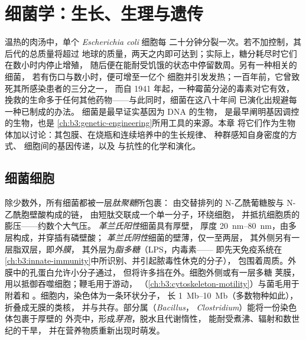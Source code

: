 \chapter{细菌学：生长、生理与遗传}\label{ch:b3:bacteriology}

温热的肉汤中，单个 \emph{Escherichia coli} 细胞每
二十分钟分裂一次。若不加控制，其后代的总质量将超过
地球的质量，两天之内即可达到；实际上，糖分耗尽时它们在数小时内停止增殖，
随后便在能耐受饥饿的状态中停留数周。另有一种相关的细菌，
若有伤口与数小时，便可增至一亿个
细胞并引发发热；一百年前，它曾致死其所感染患者的三分之一，
而自 1941 年起，一种霉菌分泌的毒素对它有效，
挽救的生命多于任何其他药物——与此同时，细菌在这八十年间
已演化出规避每一种已制成的办法。
细菌是最早证实基因为 DNA 的生物，
是最早阐明基因调控的生物，也是
\cref{ch:b3:genetic-engineering}所用工具的来源。本章
将它们作为生物体加以讨论：其包膜、在烧瓶和连续培养中的生长规律、
种群感知自身密度的方式、
细胞间的基因传递，以及
与抗性的化学和演化。

\section{细菌细胞}

\begin{definition}[包膜]\label{def:b3:bacteriology:envelope}
除少数外，所有细菌都被一层\emph{肽聚糖}所包裹：
由交替排列的 N-乙酰葡糖胺与 N-乙酰胞壁酸构成的链，
由短肽交联成一个单一分子，环绕细胞，
并抵抗细胞质的膨压——约数个大气压。
\emph{革兰氏阳性}细菌具有厚壁，
厚度 \qtyrange{20}{80}{nm}，由多层构成，并穿插有磷壁酸；
\emph{革兰氏阴性}细菌的壁薄，仅一至两层，
其外侧另有一层脂双层，即\emph{外膜}，
其外层为\emph{脂多糖}（LPS，内毒素——
即先天免疫系统在
\cref{ch:b3:innate-immunity}中所识别、并引起脓毒性休克的分子），
包围着周质。外膜中的孔蛋白允许小分子通过，
但将许多挡在外。细胞外侧或有一层多糖
荚膜，用以抵御吞噬细胞；鞭毛用于游动，
（\cref{ch:b3:cytoskeleton-motility}）与菌毛用于附着和
。细胞内，染色体为一条环状分子，
长 \qtyrange{1}{10}{Mb}（多数物种如此），折叠成无膜的类核，
并与共存。部分属（\emph{Bacillus}，
\emph{Clostridium}）能将一份染色体包裹于厚壁的
外壳中，形成\emph{芽孢}，脱水且代谢惰性，
能耐受煮沸、辐射和数世纪的干旱，
并在营养物质重新出现时萌发。
\end{definition}

